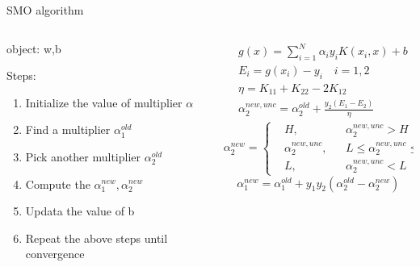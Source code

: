 \documentclass[10pt]{beamer}
\begin{document}
\begin{frame}{SMO algorithm}
 \begin{columns}
             \begin{column}{0.5\textwidth}
object: w,b \par
Steps:
\begin{enumerate}
    \item Initialize the value of multiplier $\alpha$
    \item Find a multiplier $\alpha_1^{old}$ 
    \item Pick another multiplier $\alpha_2^{old}$
    \item Compute the $\alpha_1^{new},\alpha_2^{new}$
    \item Updata the value of b
    \item Repeat the above steps until convergence
\end{enumerate}

           \end{column}
        \begin{column}{0.5\textwidth}  %
    \begin{equation} \nonumber
    \begin{aligned}
    &g(x) = \sum_{i=1}^{N}\alpha_iy_iK(x_i,x)+b \\
 &E_i = g(x_i)-y_i \quad i = 1,2 \\
&\eta = K_{11}+K_{22}-2K_{12} \\
&\alpha_2^{new,unc}= \alpha_2^{old}+\frac{y_2(E_1-E_2)}{\eta}
    \end{aligned}
\end{equation}
 \begin{equation} \nonumber
    \alpha_2^{new}=\left\{
\begin{aligned}
&H,  &&\alpha_2^{new,unc}>H\\
&\alpha_2^{new,unc}, &&L\leq \alpha_2^{new,unc}\leq H\\
&L, &&\alpha_2^{new,unc}<L
\end{aligned}
\right.
\end{equation}
\begin{equation} \nonumber
\alpha_1^{new} =    \alpha_1^{old}+y_1y_2(\alpha_2^{old}-\alpha_2^{new})
\end{equation}
        \end{column}
    \end{columns}
\end{frame}
\end{document}

